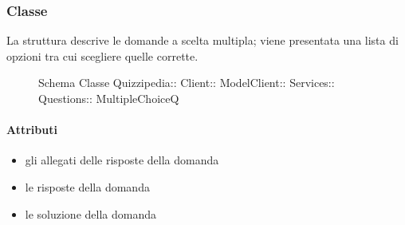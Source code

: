 \subsubsection{Classe }
La struttura descrive le domande a scelta multipla; viene presentata una lista di opzioni tra cui scegliere quelle corrette.
\begin{figure}[H]
\centering
\noindent{}
\caption[Schema Classe MultipleChoiceQ]{Schema Classe Quizzipedia:: Client:: ModelClient:: Services:: Questions:: MultipleChoiceQ}
\end{figure}
\paragraph{Attributi}
\begin{itemize}
\item {}
\newline
gli allegati delle risposte della domanda
\item {}
\newline
le risposte della domanda
\item {}
\newline
le soluzione della domanda
\end{itemize}
